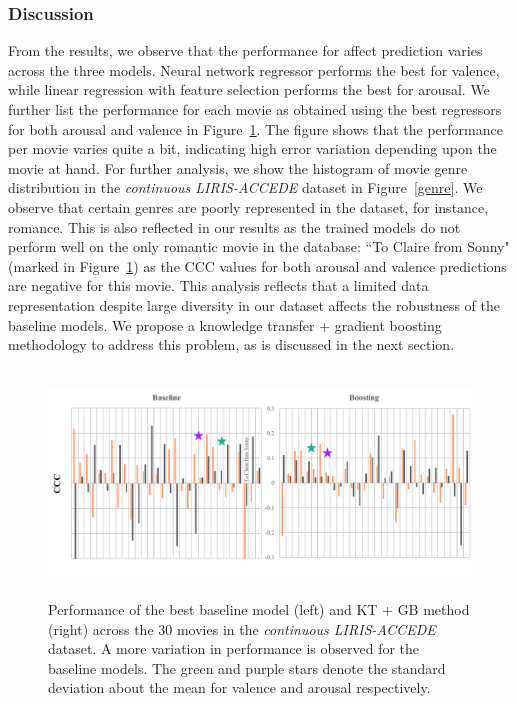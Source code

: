 \documentclass{article}
\begin{document}
\begin{spacing}{0.9}
\subsubsection{Discussion} 
\vspace{-2mm}
From the results, we observe that the performance for affect prediction varies across the three models.
Neural network regressor performs the best for valence, while linear regression with feature selection performs the best for arousal.
We further list the performance for each movie as obtained using the best regressors for both arousal and valence in Figure~\ref{comparison}. 
The figure shows that the performance per movie varies quite a bit, indicating high error variation depending upon the movie at hand. 
For further analysis, we show the histogram of movie genre distribution in the {\it continuous LIRIS-ACCEDE} dataset in Figure~\ref{genre}.
We observe that certain genres are poorly represented in the dataset, for instance, romance.
This is also reflected in our results as the trained models do not perform well on the only romantic movie in the database: ``To Claire from Sonny" (marked in Figure~\ref{comparison}) as the CCC values for both arousal and valence predictions are negative for this movie. 
This analysis reflects that a limited data representation despite large diversity in our dataset affects the robustness of the baseline models.
We propose a knowledge transfer + gradient boosting methodology to address this problem, as is discussed in the next section.


\begin{figure}[t]
\vspace{-5mm}
\includegraphics[width=\textwidth, height = 6cm]{images/comparison.pdf}
\centering
\vspace{-11mm}
\caption{Performance of the best baseline model (left) and KT + GB method (right) across the 30 movies in the {\it continuous LIRIS-ACCEDE} dataset. A more variation in performance is observed for the baseline models. The green and purple stars denote the standard deviation about the mean for valence and arousal respectively.}
\vspace{-5mm}
\label{comparison}
\end{figure}


\end{spacing}
\end{document}
